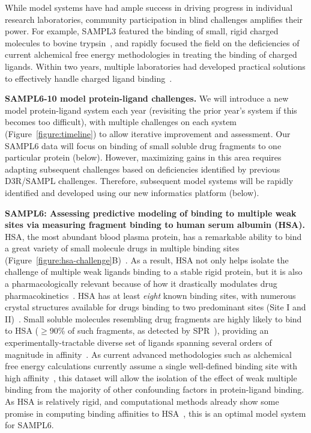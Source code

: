 \documentclass[11pt]{article}
\begin{document}
While model systems have had ample success in driving progress in individual research laboratories, community participation in blind challenges amplifies their power.
For example, SAMPL3 featured the binding of small, rigid charged molecules to bovine trypsin~\cite{Newman:2011:JComputAidedMolDes}, and rapidly focused the field on the deficiencies of current alchemical free energy methodologies in treating the binding of charged ligands.
Within two years, multiple laboratories had developed practical solutions to effectively handle charged ligand binding~\cite{Rocklin:2013:TheJournalofChemicalPhysics, lin_overview_2014, Reif:2014:JournalofComputationalChemistry}.

\textbf{SAMPL6-10 model protein-ligand challenges.} 
We will introduce a new model protein-ligand system each year (revisiting the prior year's system if this becomes too difficult), with multiple challenges on each system (Figure~\ref{figure:timeline}) to allow iterative improvement and assessment.
Our SAMPL6 data will focus on binding of small soluble drug fragments to one particular protein (below). 
However, maximizing gains in this area requires adapting subsequent challenges based on deficiencies identified by previous D3R/SAMPL challenges.
Therefore, subsequent model systems will be rapidly identified and developed using our new informatics platform (below).

\textbf{SAMPL6: Assessing predictive modeling of binding to multiple weak sites via measuring fragment binding to human serum albumin (HSA).}
HSA, the most abundant blood plasma protein, has a remarkable ability to bind a great variety of small molecule drugs in multiple binding sites (Figure~\ref{figure:hsa-challenge}B)~\cite{Fasano:2005:IUBMBLife(InternationalUnionofBiochemistryandMolecularBiology:Life)}.
As a result, HSA not only helps isolate the challenge of multiple weak ligands binding to a stable rigid protein, but it is also a pharmacologically relevant because of how it drastically modulates drug pharmacokinetics~\cite{Hall:2013:JournalofChemicalInformationandModeling}.
HSA has at least \emph{eight} known binding sites, with numerous crystal structures available for drugs binding to two predominant sites (Site I and II)~\cite{Hall:2013:JournalofChemicalInformationandModeling}.
Small soluble molecules resembling drug fragments are highly likely to bind to HSA ($\ge$90\% of such fragments, as detected by SPR~\cite{Elinder:2011:JournalofBiomolecularScreening}), providing an experimentally-tractable diverse set of ligands spanning several orders of magnitude in affinity~\cite{Elinder:2011:JournalofBiomolecularScreening}.
As current advanced methodologies such as alchemical free energy calculations currently assume a single well-defined binding site with high affinity~\cite{Gilson:1997:BiophysicalJournal}, this dataset will allow the isolation of the effect of weak multiple binding from the majority of other confounding factors in protein-ligand binding.
As HSA is relatively rigid, and computational methods already show some promise in computing binding affinities to HSA~\cite{Hall:2013:JournalofChemicalInformationandModeling,Lexa:2014:PLoSONE,Evoli:2016:bioRxiv}, this is an optimal model system for SAMPL6.
\end{document}
